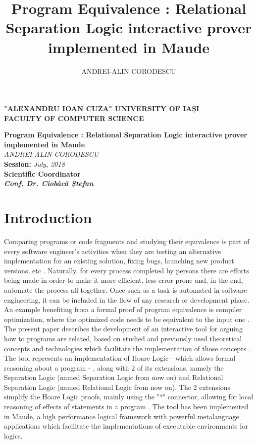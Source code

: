 \documentclass[12pt,a4paper]{article}
\author{ANDREI-ALIN CORODESCU}
\title{Program Equivalence : Relational Separation Logic interactive prover implemented in Maude}
\begin{document}
\begin{titlepage}
\begin{center}
\textbf{
"ALEXANDRU IOAN CUZA" UNIVERSITY OF IAȘI
}
\\
\textbf{FACULTY OF COMPUTER SCIENCE}
\end{center}
   \vspace{40mm}
\begin{center}
	\Large\textbf {Program Equivalence : Relational Separation Logic interactive prover implemented in Maude}\\
	\vspace{40mm}
	\large\textit {ANDREI-ALIN CORODESCU}
	\\
	\vspace{20mm}
	\textbf{Session: }\textit{July, 2018}\\
	\vspace{30mm}
	\textbf{Scientific Coordinator}\\
	\textbf{\textit{Conf. Dr. Ciobâcă Ștefan}}
	\vspace{30mm}
\end{center}
\end{titlepage}
\tableofcontents
\pagebreak

\section{Introduction}
Comparing programs or code fragments and studying their equivalence is part of every software engineer's activities when they are testing an alternative implementation for an existing solution, fixing bugs, launching new product versions, etc . Naturally, for every process completed by persons there are efforts being made in order to make it more efficient, less error-prone and, in the end, automate the process all together. Once such as a task is automated in software engineering, it can be included in the flow of any research or development phase. An example benefiting from a formal proof of program equivalence is compiler optimization, where the optimized code needs to be equivalent to the input one . \\

The present paper describes the development of an interactive tool for arguing how to programs are related, based on studied and previously used theoretical concepts and technologies which facilitate the implementation of those concepts . \\

The tool represents an implementation of Hoare Logic - which allows formal reasoning about a program - , along  with 2 of its extensions, namely the Separation Logic (named Separation Logic from now on) and Relational Separation Logic \cite{relational} (named Relational Logic from now on). The 2 extensions simplify the Hoare Logic proofs, mainly using the "*" connector, allowing for local reasoning of effects of statements in a program . The tool has been implemented in Maude, a high performance logical framework with powerful metalanguage applications which facilitate the implementations of executable environments for logics.\\
\end{document}
